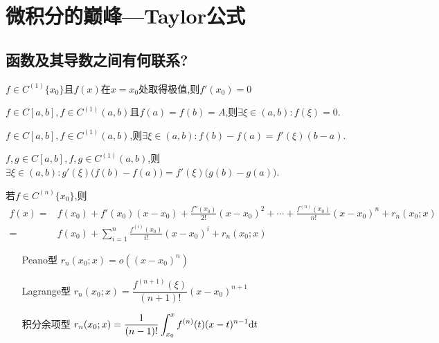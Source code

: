 \documentclass[UTF8]{book}
\begin{document}
    \chapter{微积分的巅峰---Taylor公式}
    \section*{函数及其导数之间有何联系?}
    \begin{theorem}[Fermat定理]
        $f\in C^{(1)}\{x_0\}$且$f(x)$在$x=x_0$处取得极值,则$f'(x_0)=0$
    \end{theorem}
    \setcounter{theorem}{2}
    \begin{theorem}[Rolle定理]
        $f\in C[a,b],f\in C^{(1)}(a,b)$且$f(a)=f(b)=A$,则$\exists \xi\in(a,b):f(\xi)=0$.
    \end{theorem}
    \setcounter{theorem}{7}
    \begin{theorem}[Lagrange定理]
        $f\in C[a,b],f\in C^{(1)}(a,b)$,则$\exists \xi\in(a,b):f(b)-f(a)=f'(\xi)(b-a)$.
    \end{theorem}\begin{theorem}[Cauchy定理]
        $f,g\in C[a,b],f,g\in C^{(1)}(a,b)$,则$\exists \xi\in(a,b):g'(\xi)\big(f(b)-f(a)\big)=f'(\xi)\big(g(b)-g(a)\big)$.
    \end{theorem}\begin{theorem}[Taylor定理]
        若$f\in C^{(n)}\{x_0\}$,则
        \[\begin{aligned}
            f(x)=&f(x_0)+f'(x_0)(x-x_0)+\frac{f''(x_0)}{2!}(x-x_0)^2+\cdots+\frac{f^{(n)}(x_0)}{n!}(x-x_0)^n+r_n(x_0;x)\\ 
            =&f(x_0)+\sum_{i=1}^{n}\frac{f^{(i)}(x_0)}{i!}(x-x_0)^i+r_n(x_0;x)
        \end{aligned}\]
        \begin{itemize}
            \item[\textnormal{Peano}型] $r_n(x_0;x)=o\left( (x-x_0)^n \right)$
            \item[\textnormal{Lagrange}型] $r_n(x_0;x)=\dfrac{f^{(n+1)}(\xi)}{(n+1)!}(x-x_0)^{n+1}$
            \item[积分余项型] $r_n(x_0;x)=\dfrac{1}{(n-1)!}\displaystyle\int_{x_0}^{x}f^{(n)}(t)(x-t)^{n-1}\mathrm{d} t$
        \end{itemize}
    \end{theorem}
\end{document}
